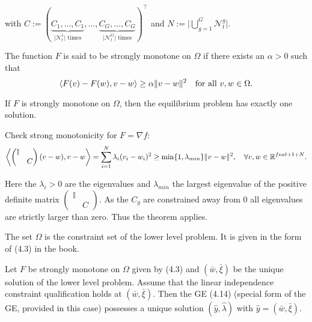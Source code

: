 with \(C := (\underbrace{C_1,...,C_1}_{\vert \mathcal{N}_t^1 \vert\text{ times}},...,\underbrace{C_G,...,C_G}_{\vert \mathcal{N}_t^G \vert\text{ times}})^{\top}\) and \(N := \vert \bigcup_{g=1}^G \mathcal{N}_t^g\vert\).

\begin{definition}
	The function \(F\) is said to be strongly monotone on \(\Omega\) if there exists an \(\alpha > 0\) such that
	\[ \left\langle F(v)-F(w),v-w\right\rangle \geq \alpha \Vert v-w \Vert^2  \quad \text{for all } v,w \in \Omega. \]
\end{definition}

\begin{theorem}
	If \(F\) is strongly monotone on \(\Omega\), then the equilibrium problem has exactly one solution.
\end{theorem}

Check strong monotonicity for \(F = \nabla f\):
\begin{equation*}
	\left\langle \begin{pmatrix} \mathbb{I}\\ & C \end{pmatrix} (v-w),v-w\right\rangle = \sum_{i=1}^N \lambda_i (v_i-w_i)^2 \geq \min\{1,\lambda_{min}\} \Vert v-w \Vert^2, \quad \forall v,w \in \mathbb{R}^{feat+1+N}.
\end{equation*}

Here the \(\lambda_i > 0\) are the eigenvalues and \(\lambda_{min}\) the largest eigenvalue of the positive definite matrix \(\begin{pmatrix} \mathbb{I}\\ & C \end{pmatrix}\). As the \(C_g\) are constrained away from 0 all eigenvalues are strictly larger than zero.
Thus the theorem applies.

The set \(\Omega\) is the constraint set of the lower level problem. It is given in the form of (4.3) in the book.

\begin{theorem}
	Let \(F\) be strongly monotone on \(\Omega\) given by (4.3) and \((\bar{w},\bar{\xi})\) be the unique solution of the lower level problem. Assume that the linear independence constraint qualification holds at \((\bar{w},\bar{\xi})\). Then the GE (4.14) (special form of the GE, provided in this case) possesses a unique solution \((\hat{y},\hat{\lambda})\) with \(\hat{y} = (\bar{w},\bar{\xi})\).
\end{theorem}

